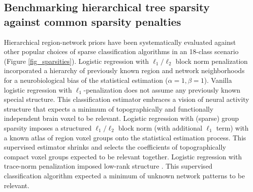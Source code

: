 \documentclass{article}
\begin{document}
\subsection{Benchmarking hierarchical tree sparsity against
common sparsity penalties}
Hierarchical region-network priors have been systematically
evaluated against other popular choices of sparse classification algorithms
in an 18-class scenario
(Figure \ref{fig_sparsities}).
%
Logistic regression with $\ell_1/\ell_2$ block norm penalization
incorporated a hierarchy of previously known region and network neighborhoods
for a neurobiological bias of the statistical estimation
($\alpha = 1, \beta = 1$).
%
Vanilla logistic regression with $\ell_1$-penalization
does not assume any previously known special structure.
This classification estimator embraces a vision of neural activity structure
that expects a minimum of
topographically and functionally independent brain voxel to be relevant.
%
Logistic regression with (sparse) group sparsity
imposes a structured $\ell_1/\ell_2$ block norm (with additional $\ell_1$ term)
with a known atlas of region voxel groups onto the statistical estimation process.
This supervised estimator shrinks and selects the coefficients
of topographically compact voxel groups expected to be relevant together.
%
Logistic regression with trace-norm penalization
imposed low-rank structure \cite{harchaoui2012large}.
This supervised classification algorithm
expected a minimum of unknown network patterns
to be relevant.
%
\end{document}
